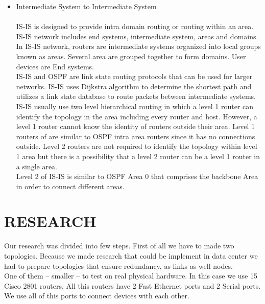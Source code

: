 \documentclass[conference,compsoc]{IEEEtran}
\begin{document}
\begin{itemize}
\item 
Intermediate System to Intermediate System\\\\
IS-IS is designed to provide intra domain routing or routing within an area. IS-IS network includes end systems, intermediate system, areas and domains. In IS-IS network, routers are intermediate systems organized into local groups known as areas. Several area are grouped together to form domains. User devices are End systems. 
\\ IS-IS and OSPF are link state routing protocols that can be used for larger networks. IS-IS uses Dijkstra algorithm to determine the shortest path and utilizes a link state database to route packets between intermediate systems. IS-IS usually use two level hierarchical routing in which a level 1 router can identify the topology in the area including every router and host. However, a level 1 router cannot know the identity of routers outside their area. Level 1 routers of are similar to OSPF intra area routers since it has no connections outside. Level 2 routers are not required to identify the topology within level 1 area but there is a possibility that a level 2 router can be a level 1 router in a single area. 
\\ Level 2 of IS-IS is similar to OSPF Area 0 that comprises the backbone Area in order to connect different areas.
\\

\end{itemize}

\section{RESEARCH}
Our research was divided into few steps. First of all we have to made two topologies. Because we made research that could be implement in data center we had to prepare topologies that ensure redundancy, as links as well nodes. 
\\ \indent One of them – smaller – to test on real physical hardware. In this case we use 15 Cisco 2801 routers. All this routers have 2 Fast Ethernet ports and 2 Serial ports. We use all of this ports to connect devices with each other.
\end{document}
